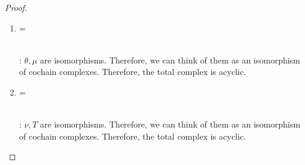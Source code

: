 \begin{proof}
\begin{enumerate}[label = (\roman*)]
\item 
{}
=
\\: $\theta, \mu$ are isomorphisms. Therefore, we can think of them as an isomorphism of cochain complexes. Therefore, the total complex is acyclic.

\item 
{}
=
\\: $\nu, T$ are isomorphisms. Therefore, we can think of them as an isomorphism of cochain complexes. Therefore, the total complex is acyclic.


\end{enumerate}
\end{proof}
